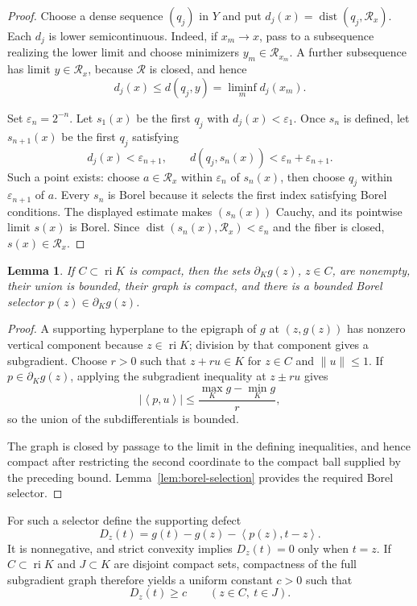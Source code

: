 \documentclass[11pt,a4paper]{amsart}
\newtheorem{lemma}[theorem]{Lemma}
\theoremstyle{remark}
\newcommand{\ri}{\operatorname{ri}}
\newcommand{\inner}[2]{\left\langle #1,#2\right\rangle}
\begin{document}
\begin{proof}
Choose a dense sequence \((q_j)\) in \(Y\) and put
\(d_j(x)=\operatorname{dist}(q_j,\mathcal R_x)\).  Each \(d_j\) is lower
semicontinuous.  Indeed, if \(x_m\to x\), pass to a subsequence realizing
the lower limit and choose minimizers \(y_m\in\mathcal R_{x_m}\).  A further
subsequence has limit \(y\in\mathcal R_x\), because \(\mathcal R\) is
closed, and hence
\[
 d_j(x)\leq d(q_j,y)=\liminf_m d_j(x_m).
\]

Set \(\varepsilon_n=2^{-n}\).  Let \(s_1(x)\) be the first \(q_j\) with
\(d_j(x)<\varepsilon_1\).  Once \(s_n\) is defined, let \(s_{n+1}(x)\) be
the first \(q_j\) satisfying
\[
 d_j(x)<\varepsilon_{n+1},\qquad
 d(q_j,s_n(x))<\varepsilon_n+\varepsilon_{n+1}.
\]
Such a point exists: choose \(a\in\mathcal R_x\) within
\(\varepsilon_n\) of \(s_n(x)\), then choose \(q_j\) within
\(\varepsilon_{n+1}\) of \(a\).  Every \(s_n\) is Borel because it selects
the first index satisfying Borel conditions.  The displayed estimate makes
\((s_n(x))\) Cauchy, and its pointwise limit \(s(x)\) is Borel.  Since
\(\operatorname{dist}(s_n(x),\mathcal R_x)<\varepsilon_n\) and the fiber is
closed, \(s(x)\in\mathcal R_x\).
\end{proof}

\begin{lemma}\label{lem:selector}
If \(C\subset\ri K\) is compact, then the sets
\(\partial_Kg(z)\), \(z\in C\), are nonempty, their union is bounded, their
graph is compact, and there is a bounded Borel selector
\(p(z)\in\partial_Kg(z)\).
\end{lemma}

\begin{proof}
A supporting hyperplane to the epigraph of \(g\) at \((z,g(z))\) has
nonzero vertical component because \(z\in\ri K\); division by that component
gives a subgradient.  Choose \(r>0\) such that
\(z+ru\in K\) for \(z\in C\) and \(\|u\|\leq1\).  If
\(p\in\partial_Kg(z)\), applying the subgradient inequality at \(z\pm ru\)
gives
\[
 |\inner{p}{u}|\leq
 \frac{\max_Kg-\min_Kg}{r},
\]
so the union of the subdifferentials is bounded.

The graph is closed by passage to the limit in the defining inequalities,
and hence compact after restricting the second coordinate to the compact
ball supplied by the preceding bound.  Lemma~\ref{lem:borel-selection}
provides the required Borel selector.
\end{proof}

For such a selector define the supporting defect
\[
 D_z(t)=g(t)-g(z)-\inner{p(z)}{t-z}.
\]
It is nonnegative, and strict convexity implies \(D_z(t)=0\) only when
\(t=z\).  If \(C\subset\ri K\) and \(J\subset K\) are disjoint compact sets,
compactness of the full subgradient graph therefore yields a uniform
constant \(c>0\) such that
\begin{equation}\label{eq:separation}
 D_z(t)\geq c\qquad(z\in C,\ t\in J).
\end{equation}
\end{document}
